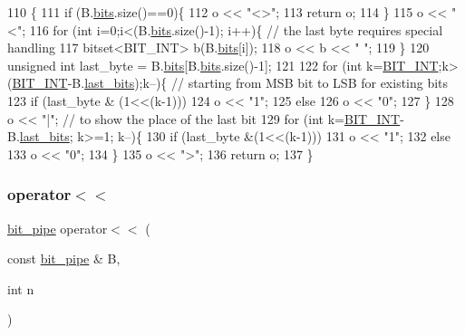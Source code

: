 \begin{DoxyCode}
110                                                     \{
111   \textcolor{keywordflow}{if} (B.\hyperlink{classbit__pipe_a86f38af1e9736b053728033490476b50}{bits}.size()==0)\{
112     o << \textcolor{stringliteral}{"<>"};
113     \textcolor{keywordflow}{return} o;
114   \}
115   o << \textcolor{stringliteral}{"<"};
116   \textcolor{keywordflow}{for} (\textcolor{keywordtype}{int} i=0;i<(B.\hyperlink{classbit__pipe_a86f38af1e9736b053728033490476b50}{bits}.size()-1); i++)\{ \textcolor{comment}{// the last byte requires special handling}
117     bitset<BIT\_INT> b(B.\hyperlink{classbit__pipe_a86f38af1e9736b053728033490476b50}{bits}[i]);
118     o << b << \textcolor{stringliteral}{" "};
119   \}
120   \textcolor{keywordtype}{unsigned} \textcolor{keywordtype}{int} last\_byte = B.\hyperlink{classbit__pipe_a86f38af1e9736b053728033490476b50}{bits}[B.\hyperlink{classbit__pipe_a86f38af1e9736b053728033490476b50}{bits}.size()-1];
121     
122   \textcolor{keywordflow}{for} (\textcolor{keywordtype}{int} k=\hyperlink{bitstream_8h_afcadf5aa65c5159bfb96c4d82ebc0a5d}{BIT\_INT};k>(\hyperlink{bitstream_8h_afcadf5aa65c5159bfb96c4d82ebc0a5d}{BIT\_INT}-B.\hyperlink{classbit__pipe_a0f3e84b02751803adaab499b5dad86fe}{last\_bits});k--)\{ \textcolor{comment}{// starting from MSB bit to LSB
       for existing bits}
123     \textcolor{keywordflow}{if} (last\_byte & (1<<(k-1)))
124       o << \textcolor{stringliteral}{"1"};
125     \textcolor{keywordflow}{else}
126       o << \textcolor{stringliteral}{"0"};
127   \}
128   o << \textcolor{stringliteral}{"|"}; \textcolor{comment}{// to show the place of the last bit}
129   \textcolor{keywordflow}{for} (\textcolor{keywordtype}{int} k=\hyperlink{bitstream_8h_afcadf5aa65c5159bfb96c4d82ebc0a5d}{BIT\_INT}-B.\hyperlink{classbit__pipe_a0f3e84b02751803adaab499b5dad86fe}{last\_bits}; k>=1; k--)\{
130     \textcolor{keywordflow}{if} (last\_byte &(1<<(k-1)))
131       o << \textcolor{stringliteral}{"1"};
132     \textcolor{keywordflow}{else}
133       o << \textcolor{stringliteral}{"0"};
134   \}
135   o << \textcolor{stringliteral}{">"};
136   \textcolor{keywordflow}{return} o;
137 \}
\end{DoxyCode}
\mbox{\label{classbit__pipe_a307267b689df83029a19dedf67cc4729}} 
\subsubsection{\texorpdfstring{operator$<$$<$}{operator<<}\hspace{0.1cm}{\footnotesize\ttfamily [2/2]}}
{\footnotesize\ttfamily \hyperlink{classbit__pipe}{bit\+\_\+pipe} operator$<$$<$ (\begin{DoxyParamCaption}\item[{const \hyperlink{classbit__pipe}{bit\+\_\+pipe} \&}]{B,  }\item[{int}]{n }\end{DoxyParamCaption})\hspace{0.3cm}{\ttfamily [friend]}}



